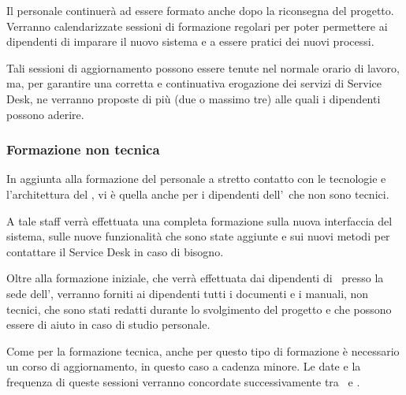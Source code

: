 			Il personale continuerà ad essere formato anche dopo la riconsegna del progetto.
			Verranno calendarizzate sessioni di formazione regolari per poter permettere ai dipendenti di imparare il nuovo sistema e a essere pratici dei nuovi processi.
			
			Tali sessioni di aggiornamento possono essere tenute nel normale orario di lavoro, ma, per garantire una corretta e continuativa erogazione dei servizi di Service Desk, ne verranno proposte di più (due o massimo tre) alle quali i dipendenti possono aderire.
			
		\subsubsection{Formazione non tecnica}
			
			In aggiunta alla formazione del personale a stretto contatto con le tecnologie e l'architettura del \helpdesk, vi è quella anche per i dipendenti dell'\istituto~che non sono tecnici.
			
			A tale staff verrà effettuata una completa formazione sulla nuova interfaccia del sistema, sulle nuove funzionalità che sono state aggiunte e sui nuovi metodi per contattare il Service Desk in caso di bisogno.
			
			Oltre alla formazione iniziale, che verrà effettuata dai dipendenti di \azienda~presso la sede dell'\istituto, verranno forniti ai dipendenti tutti i documenti e i manuali, non tecnici, che sono stati redatti durante lo svolgimento del progetto e che possono essere di aiuto in caso di studio personale.
			
			Come per la formazione tecnica, anche per questo tipo di formazione è necessario un corso di aggiornamento, in questo caso a cadenza minore.
			Le date e la frequenza di queste sessioni verranno concordate successivamente tra \azienda~e \istituto.
		